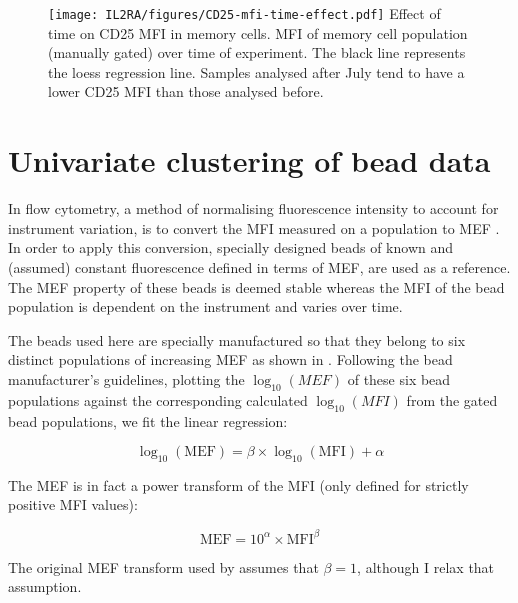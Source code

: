 \begin{figure}[h]
\centering
\texttt{[image: IL2RA/figures/CD25-mfi-time-effect.pdf]}
{Effect of time on CD25 MFI in memory cells.}
{
 MFI of memory cell population (manually gated) over time of experiment.
The black line represents the loess regression line.
Samples analysed after July tend to have a lower CD25 MFI than those analysed before.
}
\end{figure} 







\section{Univariate clustering of bead data}

In flow cytometry, a method of normalising fluorescence intensity to account for instrument variation, is to convert the \gls{MFI}
measured on a population to \gls{MEF} \citep{Schwartz:1996jj,Dendrou:2009bl}.
In order to apply this conversion, specially designed beads of known and (assumed) constant fluorescence defined in terms of \gls{MEF}, are used as a reference.
The MEF property of these beads is deemed stable whereas the MFI of the bead population is dependent on the instrument and varies over time.

The beads used here are specially manufactured so that they belong to six distinct populations of increasing MEF as shown in .
Following the bead manufacturer's guidelines, plotting the $\log_{10}(MEF)$ of these six bead populations against
the corresponding calculated $\log_{10}(MFI)$ from the gated bead populations, we fit the linear regression:

\begin{equation}
    \log_{10}(\text{MEF})=\beta \times \log_{10}(\text{MFI}) + \alpha
\label{equ:MEF}
\end{equation}

The MEF is in fact a power transform of the MFI (only defined for strictly positive MFI values):

\[
    \text{MEF}= 10^\alpha \times \text{MFI}^\beta
\]

The original MEF transform used by \citet{Dendrou:2009bl} assumes that $\beta=1$,
although I relax that assumption.

